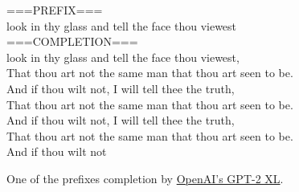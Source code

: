 \documentclass{article}
\begin{document}
\begin{figure*}[h!]
    \centering
    \begin{tcolorbox}[colframe=black!10!white, colback=black!5!white]
        \begin{minipage}{\textwidth}
            \ttfamily
            ===PREFIX===\\
            look in thy glass and tell the face thou viewest\\
            
            ===COMPLETION===\\
            look in thy glass and tell the face thou viewest,\\
            
            That thou art not the same man that thou art seen to be.\\
            
            And if thou wilt not, I will tell thee the truth,\\
            
            That thou art not the same man that thou art seen to be.\\
            
            And if thou wilt not, I will tell thee the truth,\\
            
            That thou art not the same man that thou art seen to be.\\
            
            And if thou wilt not
        \end{minipage}
    \end{tcolorbox}
    \caption{One of the prefixes completion by \href{https://huggingface.co/openai-community/gpt2-xl}{OpenAI's GPT-2 XL}.}
    \label{I3:gpt-2-xl-example}
\end{figure*}
\end{document}
